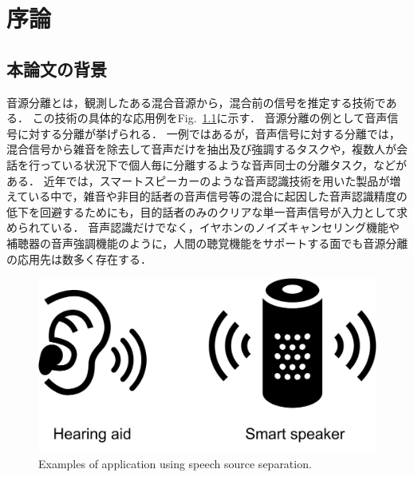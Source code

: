 \chapter{序論}
\label{chap:intro}

\section{本論文の背景}

音源分離とは，観測したある混合音源から，混合前の信号を推定する技術である．
この技術の具体的な応用例をFig.~\ref{fig:apps}に示す．
音源分離の例として音声信号に対する分離が挙げられる．
一例ではあるが，音声信号に対する分離では，混合信号から雑音を除去して音声だけを抽出及び強調するタスクや，複数人が会話を行っている状況下で個人毎に分離するような音声同士の分離タスク，などがある．
近年では，スマートスピーカーのような音声認識技術を用いた製品が増えている中で，雑音や非目的話者の音声信号等の混合に起因した音声認識精度の低下を回避するためにも，目的話者のみのクリアな単一音声信号が入力として求められている．
音声認識だけでなく，イヤホンのノイズキャンセリング機能や補聴器の音声強調機能のように，人間の聴覚機能をサポートする面でも音源分離の応用先は数多く存在する．
\begin{figure}[t]
    \vspace{4pt}
    \begin{center}
        \includegraphics[width=0.7\columnwidth]{figures/using_audio_sep.pdf}
    \end{center}
    \vspace{-8pt}
	\caption{Examples of application using speech source separation.}
	\label{fig:apps}
\end{figure}

